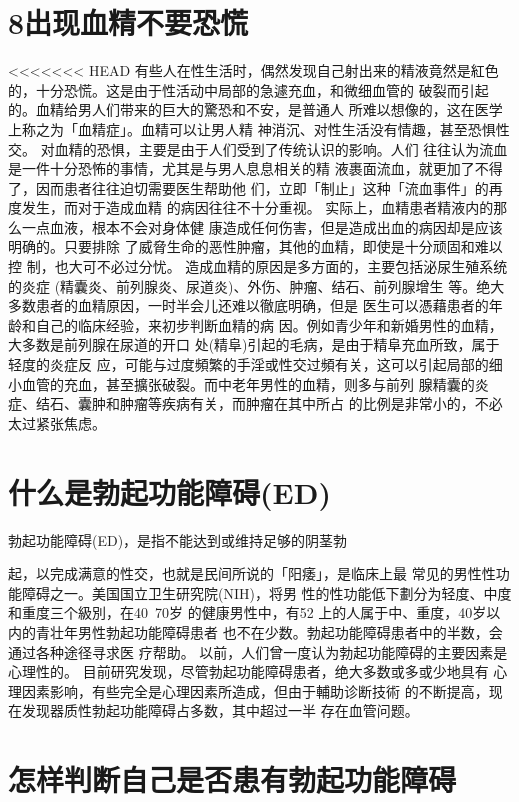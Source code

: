 \documentclass[12pt,UTF8]{ctexbook}
\begin{document}
\section{8出现血精不要恐慌}
<<<<<<< HEAD
有些人在性生活时，偶然发现自己射出来的精液竟然是紅色
的，十分恐慌。这是由于性活动中局部的急遽充血，和微细血管的
破裂而引起的。血精给男人们带来的巨大的驚恐和不安，是普通人
所难以想像的，这在医学上称之为「血精症」。血精可以让男人精
神消沉、对性生活没有情趣，甚至恐惧性交。
对血精的恐惧，主要是由于人们受到了传统认识的影响。人们
往往认为流血是一件十分恐怖的事情，尤其是与男人息息相关的精
液裹面流血，就更加了不得了，因而患者往往迫切需要医生帮助他
们，立即「制止」这种「流血事件」的再度发生，而对于造成血精
的病因往往不十分重视。
实际上，血精患者精液内的那么一点血液，根本不会对身体健
康造成任何伤害，但是造成出血的病因却是应该明确的。只要排除
了威脅生命的恶性肿瘤，其他的血精，即使是十分顽固和难以控
制，也大可不必过分忧。
造成血精的原因是多方面的，主要包括泌尿生殖系统的炎症
(精囊炎、前列腺炎、尿道炎)、外伤、肿瘤、结石、前列腺增生
等。绝大多数患者的血精原因，一时半会儿还难以徹底明确，但是
医生可以憑藉患者的年龄和自己的临床经验，来初步判断血精的病
因。例如青少年和新婚男性的血精，大多数是前列腺在尿道的开口
处(精阜)引起的毛病，是由于精阜充血所致，属于轻度的炎症反
应，可能与过度頻繁的手淫或性交过頻有关，这可以引起局部的细
小血管的充血，甚至擴张破裂。而中老年男性的血精，则多与前列
腺精囊的炎症、结石、囊肿和肿瘤等疾病有关，而肿瘤在其中所占
的比例是非常小的，不必太过紧张焦虑。
\section{什么是勃起功能障碍(ED)}
勃起功能障碍(ED)，是指不能达到或维持足够的阴茎勃

起，以完成满意的性交，也就是民间所说的「阳痿」，是临床上最
常见的男性性功能障碍之一。美国国立卫生研究院(NIH)，将男
性的性功能低下劃分为轻度、中度和重度三个級別，在40~70岁
的健康男性中，有52%
上的人属于中、重度，40岁以内的青壮年男性勃起功能障碍患者
也不在少数。勃起功能障碍患者中的半数，会通过各种途径寻求医
疗帮助。
以前，人们曾一度认为勃起功能障碍的主要因素是心理性的。
目前研究发现，尽管勃起功能障碍患者，绝大多数或多或少地具有
心理因素影响，有些完全是心理因素所造成，但由于輔助诊断技術
的不断提高，现在发现器质性勃起功能障碍占多数，其中超过一半
存在血管问题。

\section{怎样判断自己是否患有勃起功能障碍}
\end{document}
